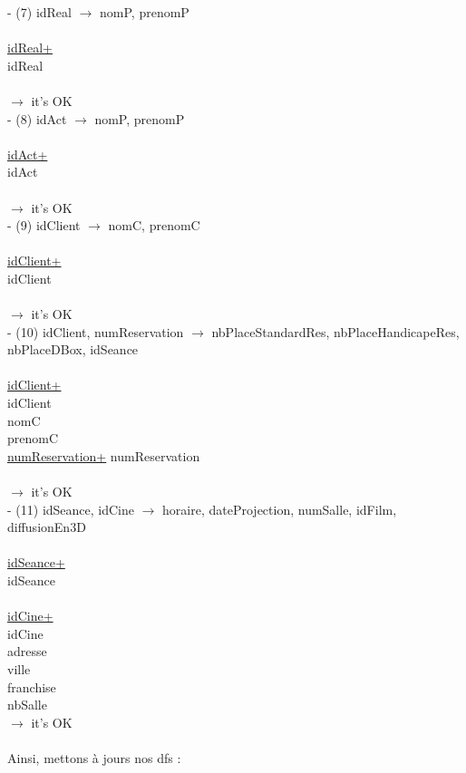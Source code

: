 \documentclass[a4paper,sffamily,12pt]{article}
\begin{document}
						\noindent - (7) idReal $\rightarrow$ nomP, prenomP \\
							\\
							\underline{idReal+} \\
							idReal \\
							\\									
						$\rightarrow$ it's OK \\	
						
						\noindent - (8) idAct $\rightarrow$ nomP, prenomP \\
							\\
							\underline{idAct+} \\
							idAct \\	
							\\									
						$\rightarrow$ it's OK \\	

						\noindent - (9) idClient $\rightarrow$ nomC, prenomC \\
							\\
							\underline{idClient+} \\
							idClient \\	
							\\									
						$\rightarrow$ it's OK \\		

						\noindent - (10) idClient, numReservation $\rightarrow$ nbPlaceStandardRes, nbPlaceHandicapeRes, nbPlaceDBox, idSeance \\
							\\
							\underline{idClient+} \\
							idClient \\
							nomC \\
							prenomC \\
							\underline{numReservation+}
							numReservation \\	
							\\									
						$\rightarrow$ it's OK \\		

						\noindent - (11) idSeance, idCine $\rightarrow$ horaire, dateProjection, numSalle, idFilm, diffusionEn3D \\
							\\
							\underline{idSeance+} \\
							idSeance \\
							\\		
							\underline{idCine+}\\
							idCine \\
							adresse \\
							ville \\
							franchise \\
							nbSalle \\							
						$\rightarrow$ it's OK \\							
						\\		
						Ainsi, mettons à jours nos dfs : \\																
						
\end{document}

